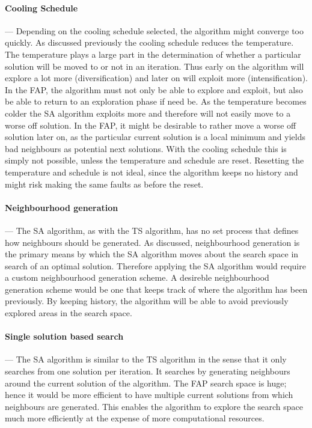 \paragraph{Cooling Schedule}
--- Depending on the cooling schedule selected, the algorithm might converge too quickly. As discussed previously the cooling schedule reduces the temperature. The temperature plays a large part in the determination of whether a particular solution will be moved to or not in an iteration. Thus early on the algorithm will explore a lot more (diversification) and later on will exploit more (intensification). In the \gls{FAP}, the algorithm must not only be able to explore and exploit, but also be able to return to an exploration phase if need be.
As the temperature becomes colder the \gls{SA} algorithm exploits more and therefore will not easily move to a worse off solution. In the \gls{FAP}, it might be desirable to rather move a worse off solution later on, as the particular current solution is a local minimum and yields bad neighbours as potential next solutions. With the cooling schedule this is simply not possible, unless the temperature and schedule are reset. Resetting the temperature and schedule is not ideal, since the algorithm keeps no history and might risk making the same faults as before the reset.
\paragraph{Neighbourhood generation}
--- The \gls{SA} algorithm, as with the \gls{TS} algorithm, has no set process that defines how neighbours should be generated. As discussed, neighbourhood generation is the primary means by which the \gls{SA} algorithm moves about the search space in search of an optimal solution. Therefore applying the \gls{SA} algorithm would require a custom neighbourhood generation scheme. A desireble neighbourhood generation scheme would be one that keeps track of where the algorithm has been previously. By keeping history, the algorithm will be able to avoid previously explored areas in the search space.
\paragraph{Single solution based search}
--- The \gls{SA} algorithm is similar to the \gls{TS} algorithm in the sense that it only searches from one solution per iteration. It searches by generating neighbours around the current solution of the algorithm. The \gls{FAP} search space is huge; hence it would be more efficient to have multiple current solutions from which neighbours are generated. This enables the algorithm to explore the search space much more efficiently at the expense of more computational resources.

